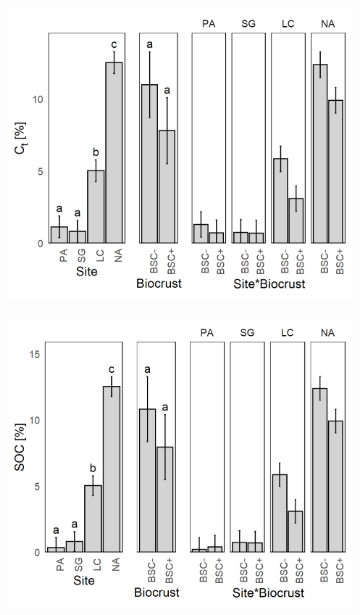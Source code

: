 \begin{figure}[htbp]
    \begin{subfigure}[b]{0.32\textwidth}
        \centering
        \includegraphics[width=\linewidth]{img/M1-Figure_2-04.png}
    \end{subfigure}
    \hfill
    \begin{subfigure}[b]{0.32\textwidth}
        \centering
        \includegraphics[width=\linewidth]{img/M1-Figure_2-05.png}
    \end{subfigure}
    \hfill
    \begin{subfigure}[b]{0.32\textwidth}

\end{subfigure}
\end{figure}
